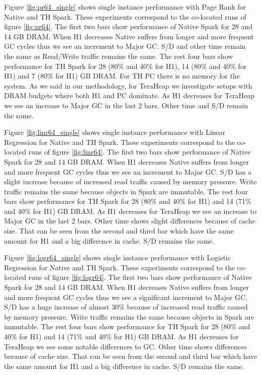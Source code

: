 Figure \ref{fig:pr64_single} shows single instance performance with Page Rank for Native and TH Spark. These experiments correspond to the co-located runs of figure \ref{fig:pr64}. The first two bars show performance of Native Spark for 28 and 14 GB DRAM. When H1 decreases Native suffers from longer and more frequent GC cycles thus we see an increment to Major GC. S/D and other time remain the same as Read/Write traffic remains the same. The rest four bars show performance for TH Spark for 28 (80\% and 40\% for H1), 14 (80\% and 40\% for H1) and 7 (80\% for H1) GB DRAM. For TH PC there is no memory for the system. As we said in our methodology, for TeraHeap we investigate setups with DRAM budgets where both H1 and PC dominate. As H1 decreases for TeraHeap we see an increase to Major GC in the last 2 bars. Other time and S/D remain the same.

Figure \ref{fig:linr64_single} shows single instance performance with Linear Regression for Native and TH Spark. These experiments correspond to the co-located runs of figure \ref{fig:linr64}. The first two bars show performance of Native Spark for 28 and 14 GB DRAM. When H1 decreases Native suffers from longer and more frequent GC cycles thus we see an increment to Major GC. S/D has a slight increase because of increased read traffic caused by memory pressure. Write traffic remains the same because objects in Spark are immutable. The rest four bars show performance for TH Spark for 28 (80\% and 40\% for H1) and 14 (71\% and 40\% for H1) GB DRAM. As H1 decreases for TeraHeap we see an increase to Major GC in the last 2 bars. Other time shows slight differences because of cache size. That can be seen from the second and third bar which have the same amount for H1 and a big difference in cache. S/D remains the same.

Figure \ref{fig:logr64_single} shows single instance performance with Logistic Regression for Native and TH Spark. These experiments correspond to the co-located runs of figure \ref{fig:logr64}. The first two bars show performance of Native Spark for 28 and 14 GB DRAM. When H1 decreases Native suffers from longer and more frequent GC cycles thus we see a significant increment to Major GC. S/D has a huge increase of almost 30\% because of increased read traffic caused by memory pressure. Write traffic remains the same because objects in Spark are immutable. The rest four bars show performance for TH Spark for 28 (80\% and 40\% for H1) and 14 (71\% and 40\% for H1) GB DRAM. As H1 decreases for TeraHeap we see some notable differences to GC. Other time shows differences because of cache size. That can be seen from the second and third bar which have the same amount for H1 and a big difference in cache. S/D remains the same.

